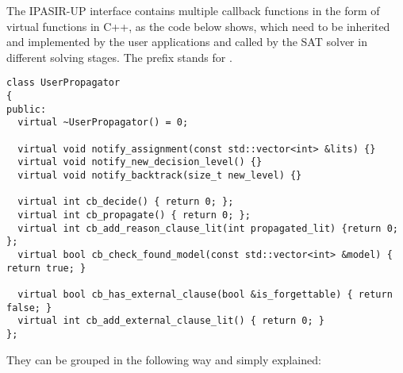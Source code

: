 The IPASIR-UP interface contains multiple callback functions in the form of virtual functions in C++, as the code below shows, which need to be inherited and implemented by the user applications and called by the SAT solver in different solving stages. The  prefix stands for .

\begin{lstlisting}
class UserPropagator
{
public:
  virtual ~UserPropagator() = 0;

  virtual void notify_assignment(const std::vector<int> &lits) {}
  virtual void notify_new_decision_level() {}
  virtual void notify_backtrack(size_t new_level) {}

  virtual int cb_decide() { return 0; };
  virtual int cb_propagate() { return 0; };
  virtual int cb_add_reason_clause_lit(int propagated_lit) {return 0; };
  virtual bool cb_check_found_model(const std::vector<int> &model) { return true; }

  virtual bool cb_has_external_clause(bool &is_forgettable) { return false; }
  virtual int cb_add_external_clause_lit() { return 0; }
};
\end{lstlisting}

They can be grouped in the following way and simply explained:


